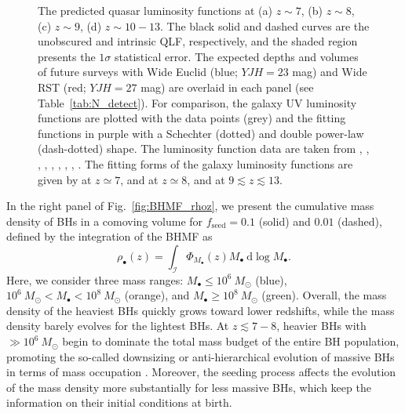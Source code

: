 \documentclass[twocolumn, twocolappendix]{aastex63}
\newcommand{\Msun}{M_\odot}
\newcommand{\Mbh}{M_\bullet}
\newcommand{\fseed}{f_\mathrm{seed}}
\newcommand{\D}{\mathrm{d}}
\begin{document}
\begin{CJK*}{UTF8}{gbsn}
\begin{figure}
\caption{
The predicted quasar luminosity functions at (a) $z\sim 7$, (b) $z\sim 8$, (c) $z\sim 9$, (d) $z\sim 10-13$.
The black solid and dashed curves are the unobscured and intrinsic QLF, respectively, and the shaded region presents the $1\sigma$ statistical error.
The expected depths and volumes of future surveys with Wide Euclid (blue; $YJH=23$ mag) and Wide RST (red; $YJH=27$ mag) are overlaid in each panel (see Table~\ref{tab:N_detect}).
For comparison, the galaxy UV luminosity functions are plotted with the data points (grey) and the fitting functions in purple with a Schechter (dotted) and double power-law (dash-dotted) shape.
The luminosity function data are taken from \citet{2013MNRAS.432.2696M}, \citet{2016ApJ...819..129O}, \citet{2018ApJ...867..150M},
\citet{2019ApJ...883...99S}, \citet{2020MNRAS.493.2059B}, \citet{2021AJ....162...47B},
\citet{2022ApJS..259...20H,Harikane_2022b,Harikane_2022c}, \citet{2022arXiv220712356D}, \citet{2022arXiv220709434N}.
The fitting forms of the galaxy luminosity functions are given by \citet{2022ApJS..259...20H} at $z\simeq 7$, 
\citet{2020MNRAS.493.2059B} and \citet{2013MNRAS.432.2696M} at $z\simeq 8$, and \citet{Harikane_2022c} at $9\lesssim z\lesssim 13$.}
\label{fig:LFs}
\vspace{5mm}
\end{figure}



In the right panel of Fig.~\ref{fig:BHMF_rhoz}, we present the cumulative mass density of BHs in a comoving volume
for $\fseed=0.1$ (solid) and $0.01$ (dashed),
defined by the integration of the BHMF as
%
\begin{equation}
 \rho_\bullet(z)=\int_{\mathcal{I}} \Phi_{\Mbh} (z) \Mbh ~\D \log \Mbh.
\end{equation}
%
Here, we consider three mass ranges: $M_\bullet \leq 10^6~\Msun$ (blue), $10^6~\Msun < M_\bullet < 10^8~\Msun$ (orange),
and $M_\bullet \geq 10^8~\Msun$ (green).
Overall, the mass density of the heaviest BHs quickly grows toward lower redshifts,
while the mass density barely evolves for the lightest BHs.
At $z\lesssim 7-8$, heavier BHs with $\gg 10^6~\Msun$ begin to dominate the total mass budget of the entire BH population,
promoting the so-called downsizing or anti-hierarchical evolution of massive BHs 
in terms of mass occupation \citep[e.g.,][]{2014ApJ...786..104U}.
Moreover, the seeding process affects the evolution of the mass density more substantially for less massive BHs,
which keep the information on their initial conditions at birth.




\end{CJK*}
\end{document}
